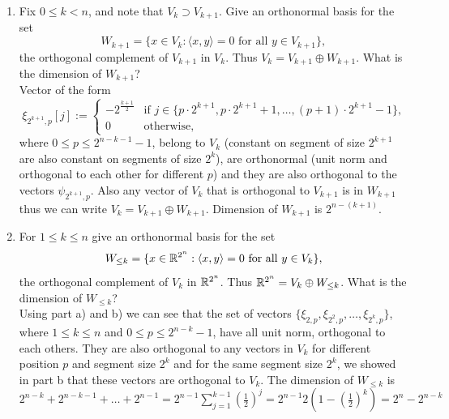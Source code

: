 \documentclass[12pt,twoside]{article}
\begin{document}
\begin{enumerate}
\begin{enumerate}
  \item Fix $0\leq k < n$, and note that $V_k\supset V_{k+1}$.  Give an orthonormal basis for
    the set
    $$W_{k+1}=\{x\in V_k : \text{$\langle x,y\rangle = 0$ for all
      $y\in V_{k+1}$}\},$$
    the orthogonal complement of $V_{k+1}$ in $V_k$.  Thus
    $V_k=V_{k+1}\oplus W_{k+1}$. What is the
    dimension of $W_{k+1}$?\\
    
    Vector of the form 
    $$\xi_{2^{k+1},p}[j] :=
  \begin{cases}
    -2^{\frac{k+1}{2}} & \text{if $j\in\{p\cdot 2^{k+1},p\cdot 2^{k+1}+1,\ldots,(p+1)\cdot2^{k+1}-1\}$,}\\
    0 & \text{otherwise,}
  \end{cases}
  $$  where $0 \leq p \leq 2^{n-k-1}-1$,
  belong to $V_k$ (constant on segment of size $2^{k+1}$ are also constant on segments of size $2^k$), are orthonormal (unit norm and orthogonal to each other for different $p$) and they are also orthogonal to the vectors
  $\psi_{2^{k+1},p}$. Also any vector of $V_k$ that is orthogonal to  $V_{k+1}$  is in $W_{k+1}$ thus we can write
  $V_k=V_{k+1}\oplus W_{k+1}$.
  Dimension of  $W_{k+1}$ is $2^{n-(k+1)}$.


  \item For $1\leq k\leq n$ give an orthonormal basis for the set
    $$W_{\leq k}=\{x\in \mathbb{R}^{2^n} : \text{$\langle x,y\rangle = 0$ for all
      $y\in V_{k}$}\},$$
    the orthogonal complement of $V_{k}$ in $\mathbb{R}^{2^n}$.  Thus
    $\mathbb{R}^{2^n}=V_{k}\oplus W_{\leq k}$. What is the
    dimension of $W_{\leq k}$?\\
    Using part a) and b) we can see that the set of vectors $\{\xi_{2,p}, \xi_{2^2,p}, \ldots, \xi_{2^k,p}\}$, where $1\leq k\leq n$ and  $0 \leq p \leq 2^{n-k}-1$,  
    have all unit norm, orthogonal to each others. 
    They are also orthogonal to any vectors in $V_k$ for different position $p$ and segment size $2^k$ and for the same segment size $2^k$, we showed in part b
    that these vectors are orthogonal to $V_k$.
    The dimension of  $W_{\leq k}$ is $2^{n-k} +  2^{n-k-1} + \ldots + 2^{n-1} = 2^{n-1} \sum_{j=1}^{k-1} (\frac{1}{2})^j =  2^{n-1} 2 (1 - (\frac{1}{2})^k)= 2^n-2^{n-k}$ 
    

\end{enumerate}
\end{enumerate}
\end{document}

